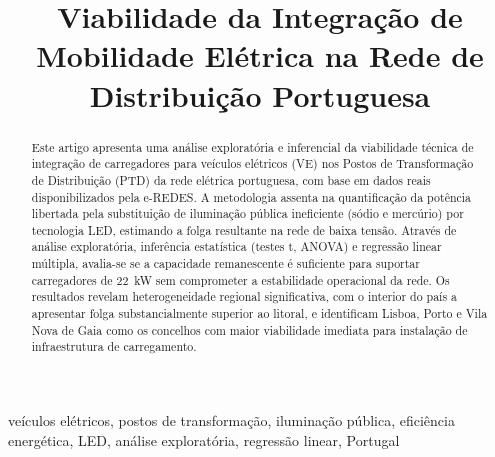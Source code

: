\documentclass[conference]{IEEEtran}
\begin{document}
\title{Viabilidade da Integração de Mobilidade Elétrica na Rede de Distribuição Portuguesa}
\author{
\and
{}
\and
{}
}

\maketitle


\begin{abstract}
Este artigo apresenta uma análise exploratória e inferencial da viabilidade técnica de integração de carregadores para veículos elétricos (VE) nos Postos de Transformação de Distribuição (PTD) da rede elétrica portuguesa, com base em dados reais disponibilizados pela e-REDES. A metodologia assenta na quantificação da potência libertada pela substituição de iluminação pública ineficiente (sódio e mercúrio) por tecnologia LED, estimando a folga resultante na rede de baixa tensão. Através de análise exploratória, inferência estatística (testes t, ANOVA) e regressão linear múltipla, avalia-se se a capacidade remanescente é suficiente para suportar carregadores de 22~kW sem comprometer a estabilidade operacional da rede. Os resultados revelam heterogeneidade regional significativa, com o interior do país a apresentar folga substancialmente superior ao litoral, e identificam Lisboa, Porto e Vila Nova de Gaia como os concelhos com maior viabilidade imediata para instalação de infraestrutura de carregamento.
\end{abstract}

\begin{IEEEkeywords}
veículos elétricos, postos de transformação, iluminação pública, eficiência energética, LED, análise exploratória, regressão linear, Portugal
\end{IEEEkeywords}
\end{document}
